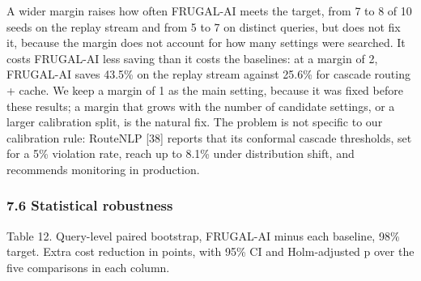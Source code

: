 \documentclass[
  10pt,
]{article}
\begin{document}
A wider margin raises how often FRUGAL-AI meets the target, from 7 to 8
of 10 seeds on the replay stream and from 5 to 7 on distinct queries,
but does not fix it, because the margin does not account for how many
settings were searched. It costs FRUGAL-AI less saving than it costs the
baselines: at a margin of 2, FRUGAL-AI saves 43.5\% on the replay stream
against 25.6\% for cascade routing + cache. We keep a margin of 1 as the
main setting, because it was fixed before these results; a margin that
grows with the number of candidate settings, or a larger calibration
split, is the natural fix. The problem is not specific to our
calibration rule: RouteNLP {[}38{]} reports that its conformal cascade
thresholds, set for a 5\% violation rate, reach up to 8.1\% under
distribution shift, and recommends monitoring in production.

\subsubsection{7.6 Statistical robustness}\label{statistical-robustness}

Table 12. Query-level paired bootstrap, FRUGAL-AI minus each baseline,
98\% target. Extra cost reduction in points, with 95\% CI and
Holm-adjusted p over the five comparisons in each column.
\end{document}
